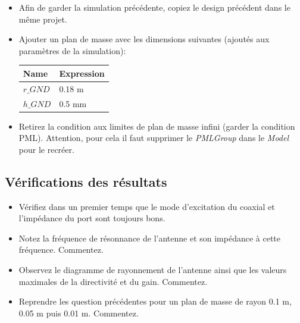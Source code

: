 \begin{itemize}
    \item Afin de garder la simulation précédente, copiez le design précédent dans le même projet.
    
    \item Ajouter un plan de masse avec les dimensions suivantes (ajoutés aux paramètres de la simulation):
    
    \begin{center}
    \begin{tabular}{|l|l|}  %
    \hline %
    \textbf{Name} & \textbf{Expression} \\
    \hline %
    $r\_GND$ & 0.18 m \\
    $h\_GND$ & 0.5 mm \\
    \hline %
    \end{tabular}
    \end{center}

    \item Retirez la condition aux limites de plan de masse infini (garder la condition PML). Attention, pour cela il faut supprimer le \textit{PMLGroup} dans le \textit{Model} pour le recréer.

 \end{itemize}

\subsection{Vérifications des résultats}

\begin{itemize}
    \item Vérifiez dans un premier temps que le mode d'excitation du coaxial et l'impédance du port sont toujours bons.
    
    \item Notez la fréquence de résonnance de l'antenne et son impédance à cette fréquence. Commentez.
    
    \item Observez le diagramme de rayonnement de l'antenne ainsi que les valeurs maximales de la directivité et du gain. Commentez.
    
    \item Reprendre les question précédentes pour un plan de masse de rayon 0.1 m, 0.05 m puis 0.01 m. Commentez.
\end{itemize}